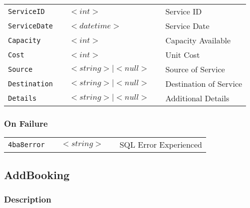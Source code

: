 \begin{tabular}{lllll}
\verb!ServiceID! & \hspace{15mm} & $<int>$ & \hspace{15mm} & Service ID \\
\verb!ServiceDate! & \hspace{15mm} & $<datetime>$ & \hspace{15mm} & Service Date \\
\verb!Capacity! & \hspace{15mm} & $<int>$ & \hspace{15mm} & Capacity Available \\
\verb!Cost! & \hspace{15mm} & $<int>$ & \hspace{15mm} & Unit Cost \\
\verb!Source! & \hspace{15mm} & $<string> \mid <null>$ & \hspace{15mm} & Source of Service \\
\verb!Destination! & \hspace{15mm} & $<string> \mid  <null>$ & \hspace{15mm} & Destination of Service \\
\verb!Details! & \hspace{15mm} & $<string> \mid <null>$ & \hspace{15mm} & Additional Details \\
\end{tabular}
\subsubsection{On Failure}

\begin{tabular}{lllll}
\verb!4ba8error! & \hspace{15mm} & $<string>$ & \hspace{15mm} & SQL Error Experienced \\
\end{tabular}


\subsection{AddBooking}

\subsubsection{Description}

